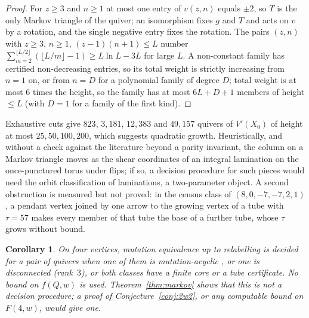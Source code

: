 \documentclass[11pt]{amsart}
\newtheorem{corollary}[theorem]{Corollary}
\theoremstyle{definition}
\theoremstyle{remark}
\newcommand{\Vp}{V'}
\begin{document}
\begin{proof}
For $z\ge3$ and $n\ge1$ at most one entry of $v(z,n)$ equals $\pm2$, so $T$ is the only Markov triangle of the quiver; an isomorphism fixes $g$ and $T$ and acts on $v$ by a rotation, and the single negative entry fixes the rotation. The pairs $(z,n)$ with $z\ge3$, $n\ge1$, $(z-1)(n+1)\le L$ number $\sum_{m=2}^{\lfloor L/2\rfloor}(\lfloor L/m\rfloor-1)\ge L\ln L-3L$ for large $L$. A non-constant family has certified non-decreasing entries, so its total weight is strictly increasing from $n=1$ on, or from $n=D$ for a polynomial family of degree $D$; total weight is at most $6$ times the height, so the family has at most $6L+D+1$ members of height $\le L$ (with $D=1$ for a family of the first kind).
\end{proof}

Exhaustive cuts give $823$, $3{,}181$, $12{,}383$ and $49{,}157$ quivers of $\Vp(X_0)$ of height at most $25,50,100,200$, which suggests quadratic growth. Heuristically, and without a check against the literature beyond a parity invariant, the column on a Markov triangle moves as the shear coordinates of an integral lamination on the once-punctured torus under flips; if so, a decision procedure for such pieces would need the orbit classification of laminations, a two-parameter object. A second obstruction is measured but not proved: in the census class of $(8,0,-7,-7,2,1)$, a pendant vertex joined by one arrow to the growing vertex of a tube with $\tau=57$ makes every member of that tube the base of a further tube, whose $\tau$ grows without bound.

\begin{corollary}\label{cor:n4decided}
On four vertices, mutation equivalence up to relabelling is decided for a pair of quivers when one of them is mutation-acyclic \cite{AHJL}, or one is disconnected (rank~$3$), or both classes have a finite core or a tube certificate. No bound on $f(Q,w)$ is used. Theorem~\ref{thm:markov} shows that this is not a decision procedure; a proof of Conjecture~\ref{conj:2w2}, or any computable bound on $F(4,w)$, would give one.
\end{corollary}
\end{document}

